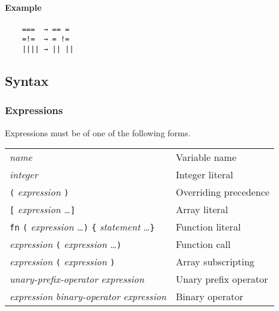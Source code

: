 \paragraph{Example}

\begin{verbatim}
    ===  → == =
    =!=  → = !=
    |||| → || ||
\end{verbatim}

\subsection{Syntax}

\subsubsection{Expressions}

Expressions must be of one of the following forms.

\begin{table}[H]
    \begin{tabular}{ l l }
        \textit{name}                                                                                      & Variable name         \\
        \textit{integer}                                                                                   & Integer literal       \\
        \verb|(| \textit{expression} \verb|)|                                                              & Overriding precedence \\
        \verb|[| \textit{expression} \ldots \verb|]|                                                       & Array literal         \\
        \verb|fn| \verb|(| \textit{expression} \ldots \verb|)| \verb|{| \textit{statement} \ldots \verb|}| & Function literal      \\
        \textit{expression} \verb|(| \textit{expression} \ldots \verb|)|                                   & Function call         \\
        \textit{expression} \verb|(| \textit{expression} \verb|)|                                          & Array subscripting    \\
        \textit{unary-prefix-operator} \textit{expression}                                                 & Unary prefix operator \\
        \textit{expression} \textit{binary-operator} \textit{expression}                                   & Binary operator
    \end{tabular}
\end{table}


